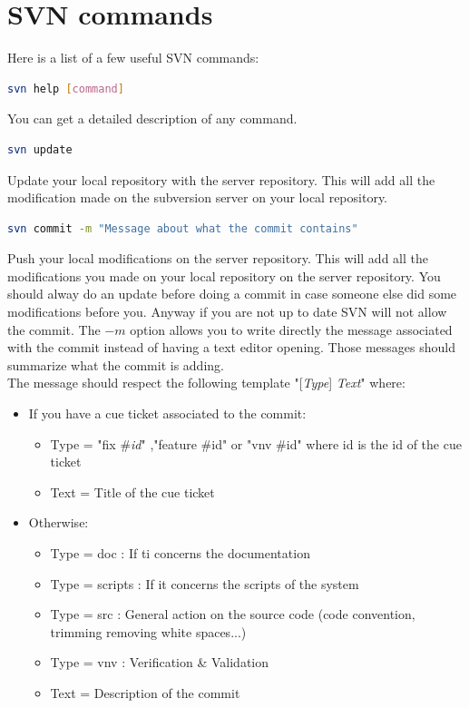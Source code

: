 \section{SVN commands}
%
%
Here is a list of a few useful SVN commands:
%
\begin{lstlisting}[language=bash]
svn help [command]
\end{lstlisting}
You can get a detailed description of any command.
%
%
\begin{lstlisting}[language=bash]
svn update
\end{lstlisting}
Update your local repository with the server repository. This will add all the
modification made on the subversion server on your local repository.
%
\begin{lstlisting}[language=bash]
svn commit -m "Message about what the commit contains"
\end{lstlisting}
Push your local modifications on the server repository. This will add all the
modifications you made on your local repository on the server repository. You
should alway do an update before doing a commit in case someone else did some
modifications before you. Anyway if you are not up to date SVN will not allow
the commit. The $-m$ option allows you to write directly the message associated
with the commit instead of having a text editor opening. Those messages should
summarize what the commit is adding.\\
The message should respect the following template "[\textit{Type}]
\textit{Text}" where:
\begin{itemize}
\item If you have a cue ticket associated to the commit:
\begin{itemize}
\item Type = "fix \#\textit{id}" ,"feature \#id" or "vnv \#id" where id is the id of
the cue ticket
\item Text = Title of the cue ticket
\end{itemize}
\item Otherwise:
\begin{itemize}
\item Type = doc : If ti concerns the documentation
\item Type = scripts : If it concerns the scripts of the system
\item Type = src : General action on the source code (code convention, trimming removing white spaces...)
\item Type = vnv : Verification \& Validation
\item Text = Description of the commit
\end{itemize}
\end{itemize}
